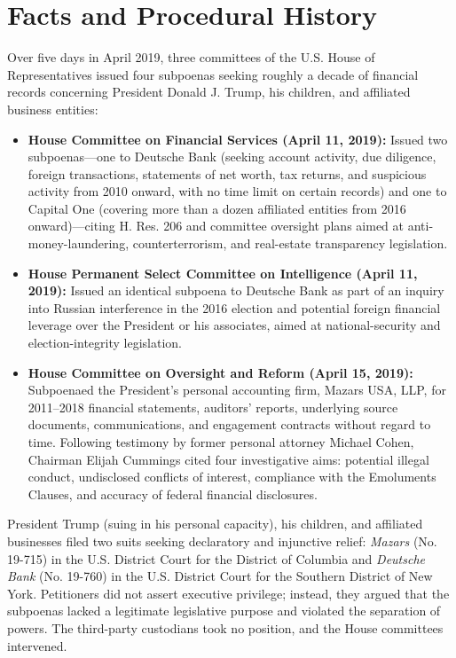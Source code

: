 \documentclass[12pt]{article}
\begin{document}
\section{Facts and Procedural History}
Over five days in April 2019, three committees of the U.S. House of Representatives issued four subpoenas seeking roughly a decade of financial records concerning President Donald J. Trump, his children, and affiliated business entities:
\begin{itemize}
  \item \textbf{House Committee on Financial Services (April 11, 2019):} Issued two subpoenas---one to Deutsche Bank (seeking account activity, due diligence, foreign transactions, statements of net worth, tax returns, and suspicious activity from 2010 onward, with no time limit on certain records) and one to Capital One (covering more than a dozen affiliated entities from 2016 onward)---citing H. Res. 206 and committee oversight plans aimed at anti-money-laundering, counterterrorism, and real-estate transparency legislation.
  \item \textbf{House Permanent Select Committee on Intelligence (April 11, 2019):} Issued an identical subpoena to Deutsche Bank as part of an inquiry into Russian interference in the 2016 election and potential foreign financial leverage over the President or his associates, aimed at national-security and election-integrity legislation.
  \item \textbf{House Committee on Oversight and Reform (April 15, 2019):} Subpoenaed the President's personal accounting firm, Mazars USA, LLP, for 2011--2018 financial statements, auditors' reports, underlying source documents, communications, and engagement contracts without regard to time. Following testimony by former personal attorney Michael Cohen, Chairman Elijah Cummings cited four investigative aims: potential illegal conduct, undisclosed conflicts of interest, compliance with the Emoluments Clauses, and accuracy of federal financial disclosures.
\end{itemize}

President Trump (suing in his personal capacity), his children, and affiliated businesses filed two suits seeking declaratory and injunctive relief: \textit{Mazars} (No. 19-715) in the U.S. District Court for the District of Columbia and \textit{Deutsche Bank} (No. 19-760) in the U.S. District Court for the Southern District of New York. Petitioners did not assert executive privilege; instead, they argued that the subpoenas lacked a legitimate legislative purpose and violated the separation of powers. The third-party custodians took no position, and the House committees intervened.
\end{document}
